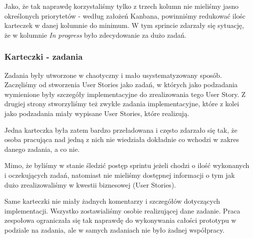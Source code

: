 \documentclass{article}
\begin{document}
Jako, że tak naprawdę korzystaliśmy tylko z trzech kolumn nie mieliśmy jasno określonych priorytetów - według założeń Kanbana, powinniśmy redukować ilośc karteczek w danej kolumnie do minimum. W tym sprincie zdarzały się sytuację, że w kolumnie \textit{In progress} było zdecydowanie za dużo zadań.

\subsubsection*{Karteczki - zadania}
Zadania były utworzone w chaotyczny i mało usystematyzowany sposób. Zaczęliśmy od stworzenia User Stories jako zadań, w których jako podzadania wymienione były szczegóły implementacyjne do zrealizowania tego User Story. Z drugiej strony stworzyliśmy też zwykłe zadania implementacyjne, które z kolei jako podzadania miały wypisane User Stories, które realizują.

Jedna karteczka była zatem bardzo przeładowana i często zdarzało się tak, że osoba pracująca nad jedną z nich nie wiedziała dokładnie co wchodzi w zakres danego zadania, a co nie.

Mimo, że byliśmy w stanie śledzić postęp sprintu jeżeli chodzi o ilość wykonanych i oczekujących zadań, natomiast nie mieliśmy dostępnej informacji o tym jak dużo zrealizowaliśmy w kwestii biznesowej (User Stories).

Same karteczki nie miały żadnych komentarzy i szczegółów dotyczących implementacji. Wszystko zostawialiśmy osobie realizującej dane zadanie. Praca zespołowa ograniczała się tak naprawdę do wykonywania całości prototypu w podziale na zadania, ale w samych zadaniach nie było żadnej współpracy.
\end{document}

